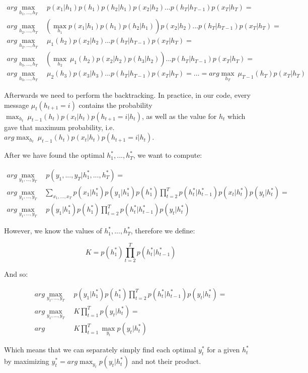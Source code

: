 \documentclass[11pt,a4paper,oneside]{report}
\begin{document}
\begin{align*}
arg\max_{h_1,...,h_T}&\ p(x_1|h_1)p(h_1)p(h_2|h_1)p(x_2|h_2)...p(h_T|h_{T-1})p(x_T|h_T)=\\	
arg\max_{h_2,...,h_T}&\left(\max_{h_1} p(x_1|h_1)p(h_1)p(h_2|h_1)\right)p(x_2|h_2)...p(h_T|h_{T-1})p(x_T|h_T)=\\
arg\max_{h_2,...,h_T}&\ \mu_1(h_2)p(x_2|h_2)...p(h_T|h_{T-1})p(x_T|h_T)=\\
arg\max_{h_3,...,h_T}&\left(\max_{h_2}\ \mu_1(h_2)p(x_2|h_2)p(h_3|h_2)\right)...p(h_T|h_{T-1})p(x_T|h_T)=\\
arg\max_{h_3,...,h_T}&\ \mu_2(h_3)p(x_3|h_3)...p(h_T|h_{T-1})p(x_T|h_T)=...=arg\max_{h_T}\ \mu_{T-1}(h_T)p(x_T|h_T)
\end{align*}

Afterwards we need to perform the backtracking. In practice, in our code, every message $\mu_t(h_{t+1} = i)$ contains the probability $\max_{h_t}\ \mu_{t-1}(h_t)p(x_t|h_t)p(h_{t+1}=i|h_t)$, as well as the value for $h_t$ which gave that maximum probability, i.e. $arg\max_{h_t}\ \mu_{t-1}(h_t)p(x_t|h_t)p(h_{t+1}=i|h_t)$.

After we have found the optimal $h_1^\ast,...,h_T^\ast$, we want to compute:

\begin{align*}
arg\max_{y_1,...,y_T}&\ p(y_1,...,y_T|h_1^\ast,...,h_T^\ast)=\\
arg\max_{y_1,...,y_T}&\sum_{x_1,...,x_T}p(x_1|h_1^\ast)p(y_1|h_1^\ast)p(h_1^\ast)\prod_{t=2}^Tp(h_t^\ast|h_{t-1}^\ast)p(x_t|h_t^\ast)p(y_t|h_t^\ast)=\\
arg\max_{y_1,...,y_T}&\ p(y_1|h_1^\ast)p(h_1^\ast)\prod_{t=2}^Tp(h_t^\ast|h_{t-1}^\ast)p(y_t|h_t^\ast)
\end{align*}

However, we know the values of $h_1^\ast,...,h_T^\ast$, therefore we define:

$$K = p(h_1^\ast)\prod_{t=2}^Tp(h_t^\ast|h_{t-1}^\ast)$$

And so:

\begin{align*}
arg\max_{y_1,...,y_T}&\ p(y_1|h_1^\ast)p(h_1^\ast)\prod_{t=2}^Tp(h_t^\ast|h_{t-1}^\ast)p(y_t|h_t^\ast)=\\
arg\max_{y_1,...,y_T}&\ K\prod_{t=1}^Tp(y_t|h_t^\ast)=\\
arg&\ K\prod_{t=1}^T\max_{y_t}p(y_t|h_t^\ast)
\end{align*}

Which means that we can separately simply find each optimal $y_t^\ast$ for a given $h_t^\ast$ by maximizing $y_t^\ast=arg\max_{y_t}p(y_t|h_t^\ast)$ and not their product.\\
\end{document}

